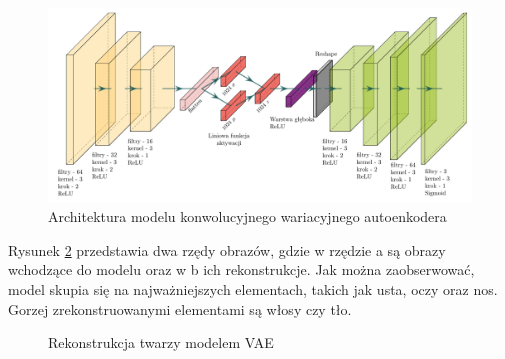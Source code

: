 \documentclass[a4paper,12pt,oneside]{book} %
\begin{document}
\begin{figure}[h!]
	\centering\includegraphics[width=\linewidth]{my_arch.pdf}
	\caption{Architektura modelu konwolucyjnego wariacyjnego autoenkodera}
	\label{fig:convvae}
\end{figure}

Rysunek \ref{fig:vaefacerecon} przedstawia dwa rzędy obrazów, gdzie w rzędzie a są obrazy wchodzące do modelu oraz w b ich rekonstrukcje. Jak można zaobserwować, model skupia się na najważniejszych elementach, takich jak usta, oczy oraz nos. Gorzej zrekonstruowanymi elementami są włosy czy tło. 
\newpage
\begin{figure}[h!]
	\centering
	\caption{Rekonstrukcja twarzy modelem VAE}
	\label{fig:vaefacerecon}
\end{figure}
\end{document}
